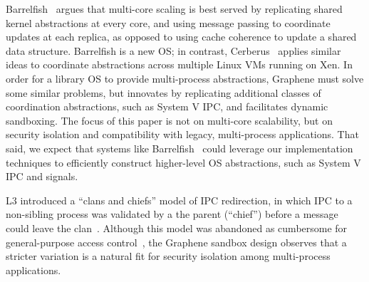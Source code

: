Barrelfish~\citep{baumann09barrelfish} argues that multi-core scaling is best served 
by replicating shared kernel abstractions at every core, and using message passing 
to coordinate updates at each replica, as opposed to using cache coherence to update a shared data structure.  
Barrelfish is a new OS; in contrast,
Cerberus~\citep{song11eurosys} applies similar ideas to coordinate abstractions
across multiple Linux VMs running on Xen.
In order for a library OS to provide multi-process abstractions, 
Graphene must solve some similar problems, but innovates by
replicating additional classes of coordination abstractions, such as System V IPC,
and facilitates dynamic sandboxing.
The focus of this paper is not on multi-core scalability, but on security isolation and compatibility with legacy, multi-process applications.
That said, we expect that systems like Barrelfish~\citep{baumann09barrelfish} 
could leverage our implementation techniques to efficiently 
construct higher-level OS abstractions, such as System V IPC and signals.


L3 introduced a ``clans and chiefs'' model of IPC redirection, in which IPC to
a non-sibling process was validated by a the parent (``chief'') before a message could leave the clan~\citep{liedtke92clans}.
Although this model was abandoned as cumbersome for general-purpose access control~\citep{elphinstone13microkernels},
the Graphene sandbox design observes
that a stricter variation is a natural fit
for security isolation among multi-process applications.

